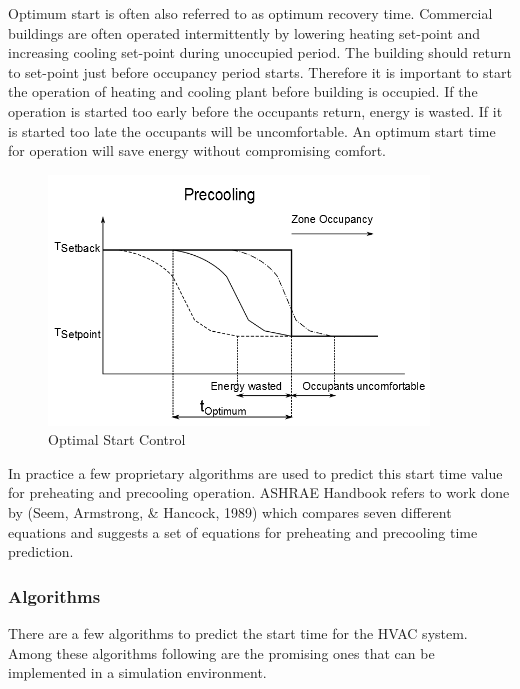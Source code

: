Optimum start is often also referred to as optimum recovery time. Commercial buildings are often operated intermittently by lowering heating set-point and increasing cooling set-point during unoccupied period. The building should return to set-point just before occupancy period starts. Therefore it is important to start the operation of heating and cooling plant before building is occupied. If the operation is started too early before the occupants return, energy is wasted. If it is started too late the occupants will be uncomfortable. An optimum start time for operation will save energy without compromising comfort.

\begin{figure}[hbtp] %
\centering
\includegraphics[width=0.9\textwidth, height=0.9\textheight, keepaspectratio=true]{media/image6731.png}
\caption{Optimal Start Control \protect \label{fig:optimal-start-control}}
\end{figure}

In practice a few proprietary algorithms are used to predict this start time value for preheating and precooling operation. ASHRAE Handbook refers to work done by (Seem, Armstrong, \& Hancock, 1989) which compares seven different equations and suggests a set of equations for preheating and precooling time prediction.

\subsubsection{Algorithms}\label{algorithms}

There are a few algorithms to predict the start time for the HVAC system. Among these algorithms following are the promising ones that can be implemented in a simulation environment.

